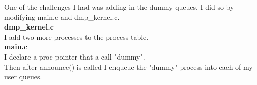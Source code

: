 \documentclass[a4paper, 12pt]{article}
\begin{document}
\noindent
One of the challenges I had was adding in the dummy queues. I did so by modifying main.c and dmp\_kernel.c. \\


\noindent
{\bf dmp\_kernel.c} \\
I add two more processes to the process table. \\

\noindent
{\bf main.c} \\
I declare a proc pointer that a call "dummy". \\
Then after announce() is called I enqueue the "dummy" process into each of my user queues. \\
\end{document}
